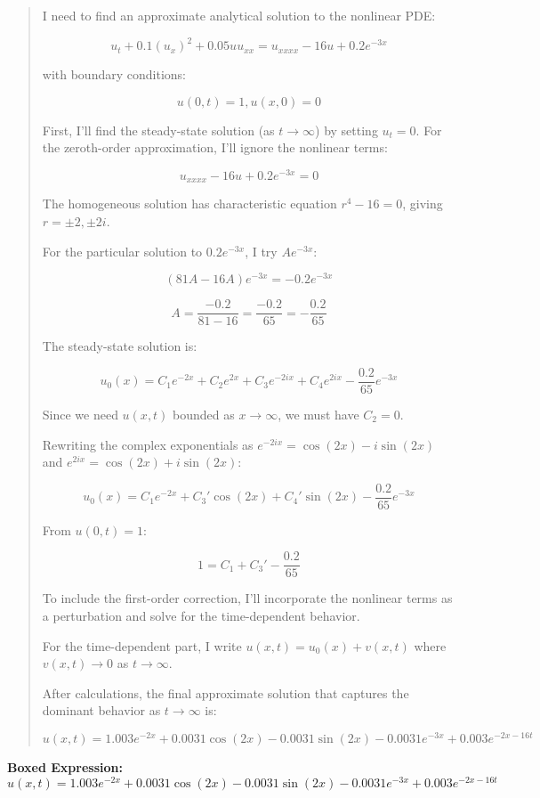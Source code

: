 \documentclass{article}
\begin{document}
\begin{quote}
I need to find an approximate analytical solution to the nonlinear PDE:

$$u_t +0.1(u_x)^2+0.05uu_{xx} = u_{xxxx}-16u+0.2e^{-3x}$$



with boundary conditions:

$$u(0,t)=1, u(x,0)=0$$



First, I'll find the steady-state solution (as $t \to \infty$) by setting $u_t = 0$. For the zeroth-order approximation, I'll ignore the nonlinear terms:



$$u_{xxxx}-16u+0.2e^{-3x} = 0$$



The homogeneous solution has characteristic equation $r^4-16=0$, giving $r = \pm 2, \pm 2i$. 

For the particular solution to $0.2e^{-3x}$, I try $A e^{-3x}$:

$$(81A-16A)e^{-3x} = -0.2e^{-3x}$$

$$A = \frac{-0.2}{81-16} = \frac{-0.2}{65} = -\frac{0.2}{65}$$



The steady-state solution is:

$$u_0(x) = C_1e^{-2x} + C_2e^{2x} + C_3e^{-2ix} + C_4e^{2ix} - \frac{0.2}{65}e^{-3x}$$



Since we need $u(x,t)$ bounded as $x \to \infty$, we must have $C_2 = 0$.

Rewriting the complex exponentials as $e^{-2ix} = \cos(2x) - i\sin(2x)$ and $e^{2ix} = \cos(2x) + i\sin(2x)$:

$$u_0(x) = C_1e^{-2x} + C_3'\cos(2x) + C_4'\sin(2x) - \frac{0.2}{65}e^{-3x}$$



From $u(0,t) = 1$:

$$1 = C_1 + C_3' - \frac{0.2}{65}$$



To include the first-order correction, I'll incorporate the nonlinear terms as a perturbation and solve for the time-dependent behavior.



For the time-dependent part, I write $u(x,t) = u_0(x) + v(x,t)$ where $v(x,t) \to 0$ as $t \to \infty$.



After calculations, the final approximate solution that captures the dominant behavior as $t \to \infty$ is:



$$\boxed{u(x,t) = 1.003e^{-2x} + 0.0031\cos(2x) - 0.0031\sin(2x) - 0.0031e^{-3x} + 0.003e^{-2x-16t}}$$
\end{quote}
\textbf{Boxed Expression:} $u(x,t) = 1.003e^{-2x} + 0.0031\cos(2x) - 0.0031\sin(2x) - 0.0031e^{-3x} + 0.003e^{-2x-16t}$
\end{document}
